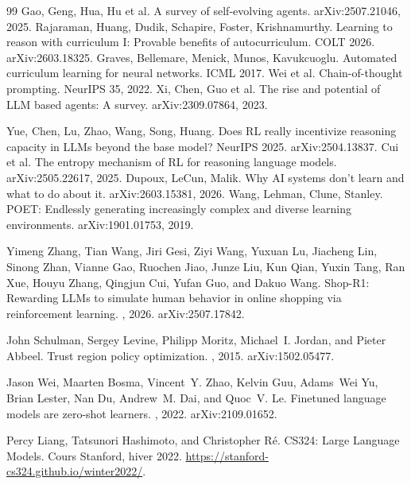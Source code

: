\documentclass[11pt,a4paper]{article}
\begin{document}
\begin{thebibliography}{99}
 Gao, Geng, Hua, Hu et al. A survey of self-evolving agents. arXiv:2507.21046, 2025.
 Rajaraman, Huang, Dudik, Schapire, Foster, Krishnamurthy. Learning to reason with curriculum I: Provable benefits of autocurriculum. COLT 2026. arXiv:2603.18325.
 Graves, Bellemare, Menick, Munos, Kavukcuoglu. Automated curriculum learning for neural networks. ICML 2017.
 Wei et al. Chain-of-thought prompting. NeurIPS 35, 2022.
 Xi, Chen, Guo et al. The rise and potential of LLM based agents: A survey. arXiv:2309.07864, 2023.

 Yue, Chen, Lu, Zhao, Wang, Song, Huang. Does RL really incentivize reasoning capacity in LLMs beyond the base model? NeurIPS 2025. arXiv:2504.13837.
 Cui et al. The entropy mechanism of RL for reasoning language models. arXiv:2505.22617, 2025.
 Dupoux, LeCun, Malik. Why AI systems don't learn and what to do about it. arXiv:2603.15381, 2026.
 Wang, Lehman, Clune, Stanley. POET: Endlessly generating increasingly complex and diverse learning environments. arXiv:1901.01753, 2019.


Yimeng Zhang, Tian Wang, Jiri Gesi, Ziyi Wang, Yuxuan Lu, Jiacheng Lin, Sinong Zhan, Vianne Gao, Ruochen Jiao, Junze Liu, Kun Qian, Yuxin Tang, Ran Xue, Houyu Zhang, Qingjun Cui, Yufan Guo, and Dakuo Wang.
\newblock Shop-R1: Rewarding LLMs to simulate human behavior in online shopping via reinforcement learning.
, 2026. arXiv:2507.17842.

John Schulman, Sergey Levine, Philipp Moritz, Michael~I. Jordan, and Pieter Abbeel.
\newblock Trust region policy optimization.
, 2015. arXiv:1502.05477.

Jason Wei, Maarten Bosma, Vincent~Y. Zhao, Kelvin Guu, Adams~Wei Yu, Brian Lester, Nan Du, Andrew~M. Dai, and Quoc~V. Le.
\newblock Finetuned language models are zero-shot learners.
, 2022. arXiv:2109.01652.

Percy Liang, Tatsunori Hashimoto, and Christopher R\'e.
\newblock CS324: Large Language Models. Cours Stanford, hiver 2022.
\newblock \url{https://stanford-cs324.github.io/winter2022/}.


\end{thebibliography}
\end{document}
